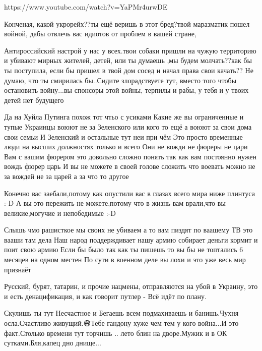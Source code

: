 {https://www.youtube.com/watch?v=YaPMr4urwDE


Конченая, какой укрорейх??ты ещё веришь в этот бред?твой маразматик пошел
войной, дабы отвлечь вас идиотов от проблем в вашей стране,

Антироссийский настрой у нас у всех.твои собаки пришли на чужую территорию и
убивают мирных жителей, детей, или ты думаешь ,мы будем молчать??как бы ты
поступила, если бы пришел в твой дом сосед и начал права свои качать?? Не
думаю, что ты смирилась бы..Сидите злорадствуете тут, вместо того чтобы
остановить войну...вы спонсоры этой войны, терпилы и рабы, у тебя и у твоих
детей нет будущего


Да на Хуйла Путинга похож тот чтьо с усиками Какие же вы ограниченные и тупые
Украинцы воюют не за Зеленского или кого то ещё а воюют за свои дома свои семьи
И Зеленский и остальные тут неи при чём Это просто временные люди на высших
должностях только и всего Они не вожди не фюреры не цари Вам с вашим фюрером
это довольно сложно понять так как вам постоянно нужен вождь фюрер царь И вы не
можете в своей голове сложить что воевать можно не за вождей не за царей а за
что то другое


Конечно вас заебали,потому как опустили вас в глазах всего мира ниже плинтуса
:-D А вы это пережить не можете,потому что в жизнь вам врали,что вы
великие,могучие и непобедимые :-D


Слышь чмо рашисткое мы своих не убиваем а то вам пиздят по ваашему ТВ это вааши
там дела Наш народ поддерждивает нашу армию собирает деньги кормит и поит свою
армию Если бы было так как ты пишешь то вы бы не топтались 6 месяцев на одном
местен По сути в военном деле вы лохи и это уже весь мир признаёт

Русский, бурят, татарин, и прочие нацмены, отправляются на убой в Украину, это
и есть денацификация, и как говорит путлер - Всё идёт по плану.


Скулишь ты тут Несчастное и Бегаешь всем подмахиваешь и банишь.Чухня
осла.Счастливо живущий.😅Тебе гандону хуже чем тем у кого война...И это
факт.Столько времени тут торчишь .. лето блин на дворе.Мужик и в ОК
сутками.Бля,капец дно днище...

}
